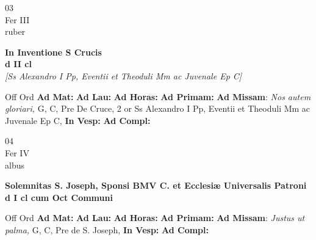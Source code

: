 \documentclass[10pt, openany]{book}
\begin{document}
    \begin{center}
        \begin{minipage}{3.5in}
            \vspace{2em}
            \begin{minipage}{0.5in}
                {\Huge 03} \\
                {\normalsize Fer III} \\
                {\normalsize ruber}
            \end{minipage}
            \begin{minipage}{3.0in}
                \textbf{ \large In Inventione S Crucis \\
                \textnormal{\normalsize d II cl}} \\ \textit{[Ss Alexandro I Pp, Eventii et Theoduli Mm ac Juvenale Ep C]} \\ 
            \end{minipage}
            \begin{justify}Off Ord
                \textbf{Ad Mat: }
                \textbf{Ad Lau: }
                \textbf{Ad Horas: }
                \textbf{Ad Primam: }\textbf{Ad Missam}: \textit{Nos autem gloriari,} G, C, Pre De Cruce, 2 or Ss Alexandro I Pp, Eventii et Theoduli Mm ac Juvenale Ep C,  
                \textbf{In Vesp: }
                \textbf{Ad Compl: }
            \end{justify}
        \end{minipage}
    \end{center}

    \begin{center}
        \begin{minipage}{3.5in}
            \vspace{2em}
            \begin{minipage}{0.5in}
                {\Huge 04} \\
                {\normalsize Fer IV} \\
                {\normalsize albus}
            \end{minipage}
            \begin{minipage}{3.0in}
                \textbf{ \large Solemnitas S. Joseph, Sponsi BMV C. et Ecclesiæ Universalis Patroni \\
                \textnormal{\normalsize d I cl cum Oct Communi}} \\ 
            \end{minipage}
            \begin{justify}Off Ord
                \textbf{Ad Mat: }
                \textbf{Ad Lau: }
                \textbf{Ad Horas: }
                \textbf{Ad Primam: }\textbf{Ad Missam}: \textit{Justus ut palma,} G, C, Pre de S. Joseph,  
                \textbf{In Vesp: }
                \textbf{Ad Compl: }
            \end{justify}
        \end{minipage}
    \end{center}
\end{document}
